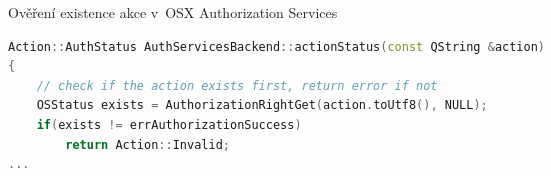 \begin{mylisting}
\caption{Ověření existence akce v~OSX Authorization Services}
\label{osxverify}
\begin{lstlisting}[language=C++]
Action::AuthStatus AuthServicesBackend::actionStatus(const QString &action)
{
    // check if the action exists first, return error if not
    OSStatus exists = AuthorizationRightGet(action.toUtf8(), NULL);
    if(exists != errAuthorizationSuccess)
        return Action::Invalid;
...
\end{lstlisting}
\end{mylisting}
